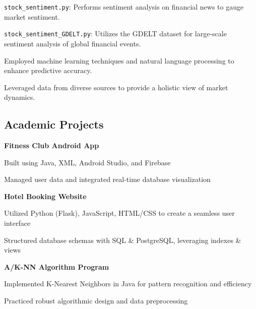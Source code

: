 \documentclass[11pt]{article}
\begin{document}
\begin{small}
\begin{compactitem}
\begin{compactitem}
        \item \texttt{stock\_sentiment.py}: Performs sentiment analysis on financial news to gauge market sentiment.
        \item \texttt{stock\_sentiment\_GDELT.py}: Utilizes the GDELT dataset for large-scale sentiment analysis of global financial events.
    \end{compactitem}
    \item Employed machine learning techniques and natural language processing to enhance predictive accuracy.
    \item Leveraged data from diverse sources to provide a holistic view of market dynamics.
\end{compactitem}
\subsection*{Academic Projects}

\noindent\textbf{Fitness Club Android App}
\begin{compactitem}
    \item Built using Java, XML, Android Studio, and Firebase
    \item Managed user data and integrated real-time database visualization
\end{compactitem}

\noindent\textbf{Hotel Booking Website}
\begin{compactitem}
    \item Utilized Python (Flask), JavaScript, HTML/CSS to create a seamless user interface
    \item Structured database schemas with SQL \& PostgreSQL, leveraging indexes \& views
\end{compactitem}

\noindent\textbf{A/K-NN Algorithm Program}
\begin{compactitem}
    \item Implemented K-Nearest Neighbors in Java for pattern recognition and efficiency
    \item Practiced robust algorithmic design and data preprocessing
\end{compactitem}

\end{small}


\end{document}
